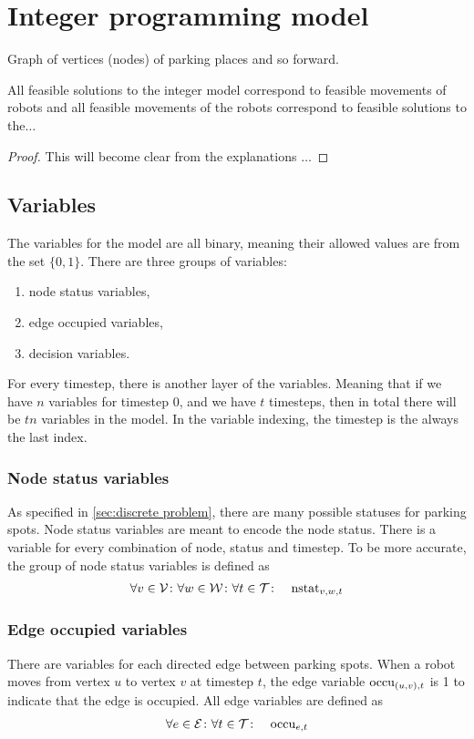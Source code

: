 \section{Integer programming model}
Graph of vertices (nodes) of parking places and so forward.
\begin{lemma}
    All feasible solutions to the integer model correspond to feasible
    movements of robots and all feasible movements of the robots correspond to
    feasible solutions to the$\ldots$
\end{lemma}
\begin{proof}
    This will become clear from the explanations $\ldots$
\end{proof}
\subsection{Variables}
The variables for the model are all binary, meaning their allowed values are from the set
$\{0,1\}$. There are three groups of variables:
\begin{enumerate}
    \item node status variables,
    \item edge occupied variables,
    \item decision variables.
\end{enumerate}
For every timestep, there is another layer of the variables. Meaning that if
we have $n$ variables for timestep $0$, and we have $t$ timesteps, then in total
there will be $tn$ variables in the model. In the variable indexing, the
timestep is the always the last index.

\subsubsection{Node status variables}
As specified in \autoref{sec:discrete problem}, there are many possible statuses
for parking spots. Node status variables are meant to encode the node status.
There is a variable for every combination of node, status and timestep. To be
more accurate, the group of node status variables is defined as
\begin{align}
    &\forall v \in \mathcal{V} \colon \forall w \in \mathcal{W} \colon \forall t \in \mathcal{T} \colon &
    \mathrm{nstat}_{v,w,t}
\end{align}

\subsubsection{Edge occupied variables}
There are variables for each directed edge between parking spots. When a robot
moves from vertex $u$ to vertex $v$ at timestep $t$, the edge variable
$\mathrm{occu}_{(u,v),t}$ is 1 to indicate that the edge is occupied. All edge variables
are defined as
\begin{align}
    &\forall e \in \mathcal{E} \colon \forall t \in \mathcal{T} \colon & \mathrm{occu}_{e,t}
\end{align}

